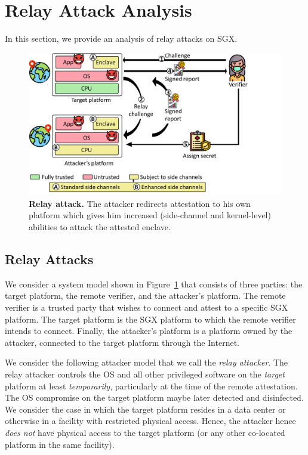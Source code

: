 \section{Relay Attack Analysis}
\label{sec:problemStatement}

In this section, we provide an analysis of relay attacks on SGX. 

\begin{figure}[t]
 \centering
  \includegraphics[trim={0 0 4.5cm 0},clip,width=0.9\linewidth]{chapters/ProximiTEE/images_new/relay.pdf}
 \caption[Relay attack]{\textbf{Relay attack.} The attacker redirects attestation to his own platform which gives him increased (side-channel and kernel-level) abilities to attack the attested enclave.}

 \label{fig:SystemModel}
\end{figure}


\subsection{Relay Attacks}
\label{sec:problemStatement:systemAttackerModel}

We consider a system model shown in Figure~\ref{fig:SystemModel} that consists of three parties: the target platform, the remote verifier, and the attacker's platform. The remote verifier is a trusted party that wishes to connect and attest to a specific SGX platform. The target platform is the SGX platform to which the remote verifier intends to connect. Finally, the attacker's platform is a platform owned by the attacker, connected to the target platform through the Internet.



 We consider the following attacker model that we call the \emph{relay attacker}. The relay attacker controls the OS and all other privileged software on the \emph{target} platform at least \emph{temporarily}, particularly at the time of the remote attestation. The OS compromise on the target platform maybe later detected and disinfected. We consider the case in which the target platform resides in a data center or otherwise in a facility with restricted physical access. Hence, the attacker hence \emph{does not} have physical access to the target platform (or any other co-located platform in the same facility). %

